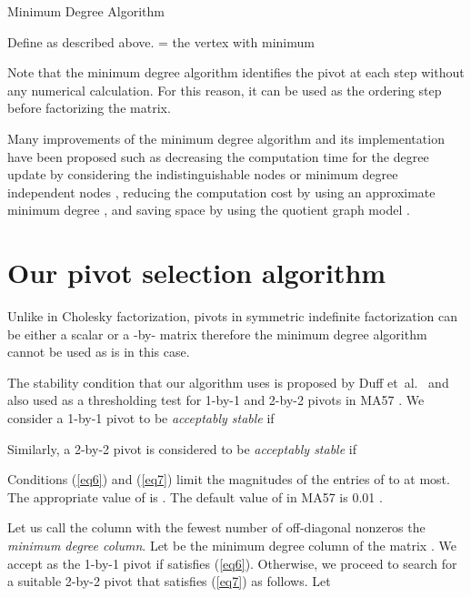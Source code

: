 \documentclass{article}
\begin{document}
\begin{algorithm}
\caption{Minimum Degree Algorithm}\label{algo1}
\begin{algorithmic}
\STATE Define  as described above.
\WHILE{ }
\STATE   = the vertex with minimum 
 \STATE  
\ENDWHILE
\end{algorithmic}
\end{algorithm}
Note that the minimum degree algorithm identifies the pivot at each step without any numerical calculation.
For this reason, it can be used as the ordering step before factorizing the matrix.


Many improvements of the minimum degree algorithm and its implementation have been proposed \cite{MDevol} such as decreasing the computation time for the degree update by considering the indistinguishable nodes \cite{massEli} or minimum degree independent nodes \cite{MMD1}, reducing the computation cost by using an approximate minimum degree \cite{AMD1}, and saving space by using the quotient graph model \cite{quotGraph}.






\section{Our pivot selection algorithm} \label{sec4}

Unlike in Cholesky factorization, pivots in symmetric indefinite factorization can be either a scalar or a -by- matrix therefore the minimum degree algorithm cannot be used as is in this case. 




The stability condition that our algorithm uses is proposed by Duff et~al.\ \cite{stCond} and also used as a thresholding test for 1-by-1 and 2-by-2 pivots in MA57 \cite{MA57}.
We consider a 1-by-1 pivot  to be \emph{acceptably stable} if

Similarly, a 2-by-2 pivot  is considered to be \emph{acceptably stable} if 

Conditions (\ref{eq6}) and (\ref{eq7}) limit the magnitudes of the entries of  to  at most.
The appropriate value of  is .
The default value of  in MA57 is 0.01 \cite{MA57}.

Let us call the column with the fewest number of off-diagonal nonzeros the \textit{minimum degree column}.
Let  be the minimum degree column of the matrix .
We accept  as the 1-by-1 pivot  if  satisfies (\ref{eq6}).
Otherwise, we proceed to search for a suitable 2-by-2 pivot  that satisfies (\ref{eq7}) as follows.
Let 
\end{document}
